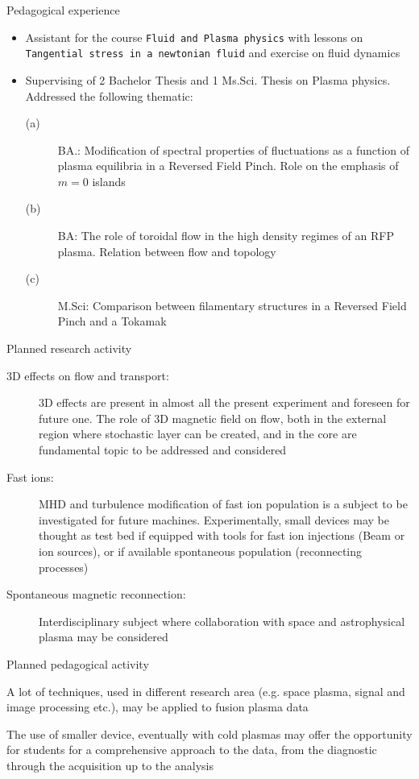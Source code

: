 \documentclass[t,10pt]{beamer}
\begin{document}
\begin{frame}{Pedagogical experience}
\begin{itemize}
\item Assistant for the course \textcolor{ta3chameleon}{\texttt{Fluid and Plasma physics} }with
  lessons on \textcolor{ta3chameleon}{\texttt{Tangential stress in a newtonian fluid}} and
  exercise on fluid dynamics
\item Supervising of 2 Bachelor Thesis and 1 Ms.Sci. Thesis on Plasma
  physics. Addressed the following thematic:
\begin{description}
\item[(a)] BA.: Modification of spectral properties of fluctuations as a
  function of plasma equilibria in a Reversed Field Pinch. Role on the
  emphasis of $m=0$ islands
\item[(b)] BA: The role of toroidal flow in the high density regimes
  of an RFP plasma. Relation between flow and topology
\item[(c)] M.Sci: Comparison between filamentary structures in a
  Reversed Field Pinch and a Tokamak
\end{description}
\end{itemize}
\end{frame}

\begin{frame}{Planned research activity}
\begin{description}
\item[3D effects on flow and transport:] 3D effects are
  present in almost all the present experiment and foreseen for future
  one. The role of 3D magnetic field on flow, both in the external
  region where stochastic layer can be created, and in the core are
  fundamental topic to be addressed and considered
\item[Fast ions:] MHD and turbulence modification of fast ion
  population is a subject to be investigated for future
  machines. Experimentally, small devices may be thought as test bed
  if equipped with tools for fast ion injections (Beam or ion
  sources), or if available spontaneous population (reconnecting processes)
\item[Spontaneous magnetic reconnection:] Interdisciplinary subject
  where collaboration with space and astrophysical plasma may be considered 
\end{description}
\end{frame}

\begin{frame}{Planned pedagogical activity}
\begin{description}
{\large \item[Multidisciplinary approach to data analysis:] A lot of
  techniques, used in different research area (e.g. space plasma,
  signal and image processing etc.), may be applied to
  fusion plasma data}
{\large\item[Small fusion device as learning tools:] The use of smaller
  device, eventually with cold plasmas may offer the opportunity
  for students for a comprehensive approach to the data, from the
  diagnostic through the acquisition up to the analysis }
\end{description}
\end{frame}
\end{document}
